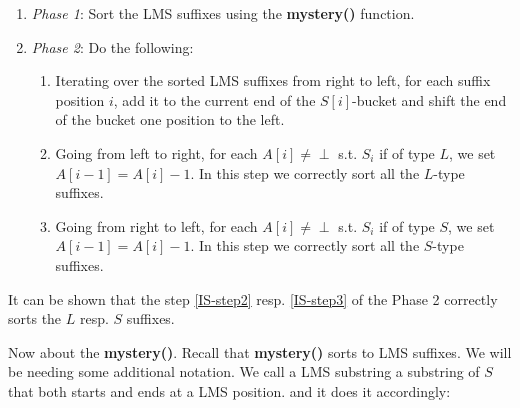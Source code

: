\begin{enumerate}
\item \textit{Phase 1}: Sort the LMS suffixes using the \textbf{mystery()} function.
\item \textit{Phase 2}: Do the following:
		\begin{enumerate}
		\def\labelenumi{\arabic{enumi}.}
		\item Iterating over the sorted LMS suffixes from right to left, for each suffix position $i$, add it to the current end of the $S[i]$-bucket and shift the end of the bucket one position to the left.
		\item Going from left to right, for each $A[i] \neq 		\perp$ s.t. $S_i$ if of type $L$, we set $A[i-1] = 			A[i] - 1$. In this step we correctly sort all the $L$-type suffixes. \label{IS-step2}
		\item Going from right to left, for each $A[i] \neq 		\perp$ s.t. $S_i$ if of type $S$, we set $A[i-1] = 			A[i] - 1$. In this step we correctly sort all the $S$-type suffixes. \label{IS-step3}
		\end{enumerate} 
\end{enumerate}

It can be shown that the step \ref{IS-step2} resp. \ref{IS-step3} of the Phase 2 correctly sorts the $L$ resp. $S$ suffixes.

Now about the \textbf{mystery()}.
Recall that \textbf{mystery()} sorts to LMS suffixes.
We will be needing some additional notation.
We call a LMS substring a substring of $S$ that both starts and ends at a LMS position.
and it does it accordingly:

